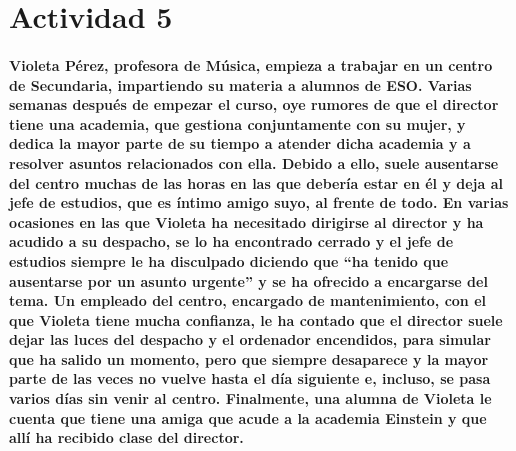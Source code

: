 \section{Actividad 5}

\paragraph{Violeta Pérez, profesora de Música, empieza a trabajar en un centro de Secundaria, impartiendo su materia a
alumnos de ESO. Varias semanas después de empezar el curso, oye rumores de que el director tiene una
academia, que gestiona conjuntamente con su mujer, y dedica la mayor parte de su tiempo a atender dicha
academia y a resolver asuntos relacionados con ella. Debido a ello, suele ausentarse del centro muchas de las
horas en las que debería estar en él y deja al jefe de estudios, que es íntimo amigo suyo, al frente de todo.
En varias ocasiones en las que Violeta ha necesitado dirigirse al director y ha acudido a su despacho, se lo ha
encontrado cerrado y el jefe de estudios siempre le ha disculpado diciendo que “ha tenido que ausentarse por
un asunto urgente” y se ha ofrecido a encargarse del tema.
Un empleado del centro, encargado de mantenimiento, con el que Violeta tiene mucha confianza, le ha
contado que el director suele dejar las luces del despacho y el ordenador encendidos, para simular que ha
salido un momento, pero que siempre desaparece y la mayor parte de las veces no vuelve hasta el día siguiente
e, incluso, se pasa varios días sin venir al centro.
Finalmente, una alumna de Violeta le cuenta que tiene una amiga que acude a la academia Einstein y que allí
ha recibido clase del director.}

